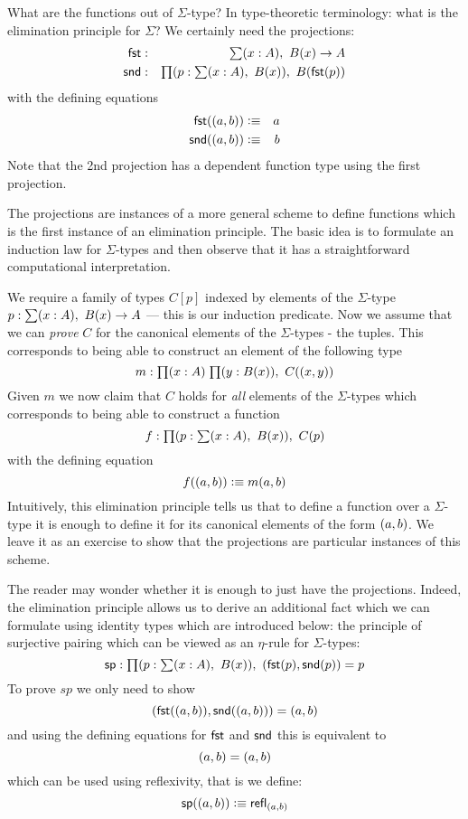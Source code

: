 What are the functions out of $\Sigma$-type? In type-theoretic
terminology: what is the elimination principle for $\Sigma$? We certainly need the projections:
\begin{eqnarray*}
  \fst & : & \sm{x : A}B(x) \to A \\
  \snd & : & \prd{p:\sm{x : A}B(x)}B(\fst(p))
\end{eqnarray*}
with the defining equations 
\begin{eqnarray*}
  \mathsf{fst}(( a,b)) & \vcentcolon\equiv & a \\
  \mathsf{snd}(( a,b)) & \vcentcolon\equiv & b
\end{eqnarray*}
Note that the 2nd projection has a dependent function type using the
first projection. 

The projections are instances of a more general
scheme to define functions which is the first instance of an
elimination principle. The basic idea is to formulate an induction law
for $\Sigma$-types and then observe that it has a straightforward
computational interpretation.

We require a family of types $C[p]$ indexed by elements of the
$\Sigma$-type $p : \sm{x : A}B(x) \to A$ --- this is our induction
predicate. Now we assume that we can \emph{prove} $C$ for the canonical
elements of the $\Sigma$-types - the tuples. This corresponds to being
able to construct an element of the following type
\[ m:\prd{x:A}{y:B(x)}C(\tup{x}{y}) \]
Given $m$ we now claim that $C$ holds for \emph{all} elements of the
$\Sigma$-types which corresponds to being able to construct a function 
\[ f : \prd{p:\sm{x : A}B(x)}C(p)\]
with the defining equation
\[ f(( a,b)) \vcentcolon\equiv m(a,b) \]
Intuitively, this elimination principle tells us that to define a
function over a $\Sigma$-type it is enough to define it for its
canonical elements of the form $( a,b)$. We leave it as an
exercise to show that the projections are particular instances of this
scheme. 

The reader may wonder whether it is enough to just have the
projections. Indeed, the elimination principle allows us to derive an
additional fact which we can formulate using identity types which are
introduced below: the principle of surjective pairing which can be
viewed as an $\eta$-rule for $\Sigma$-types:
\[ \spr : \prd{p : \sm{x:A} B(x)} \tup{\fst(p)}{\snd(p)} = p \]
To prove $sp$ we only need to show
\[ ( \mathsf{fst}(( a,b)),\mathsf{snd}(( a,b))) = ( a,b) \]
and using the defining equations for $\mathsf{fst}$ and $\mathsf{snd}$ this is
equivalent to
\[ ( a,b) = ( a,b) \]
which can be used using reflexivity, that is we define:
\[ \mathsf{sp}(( a,b)) \vcentcolon\equiv \mathsf{refl}_{( a,b)} \]

